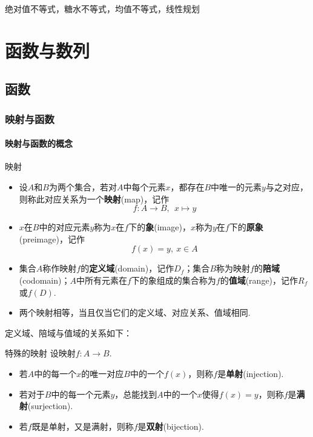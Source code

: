 \documentclass[lang=cn, zihao=4.5]{elegantbook}
\begin{document}
绝对值不等式，糖水不等式，均值不等式，线性规划

\part{函数与数列}

\chapter{函数}

\section{映射与函数}

\subsection{映射与函数的概念}

\begin{definition}{映射}
	\begin{itemize}
		\item 设$A$和$B$为两个集合，若对$A$中每个元素$x$，都存在$B$中唯一的元素$y$与之对应，则称此对应关系为一个\textbf{映射}(map)，记作$$f:A \to B,~~x \mapsto y$$
		\item $x$在$B$中的对应元素$y$称为$x$在$f$下的\textbf{象}(image)，$x$称为$y$在$f$下的\textbf{原象}(preimage)，记作$$f(x) = y,~ x \in A$$
		\item 集合$A$称作映射$f$的\textbf{定义域}(domain)，记作$D_f$；集合$B$称为映射$f$的\textbf{陪域}(codomain)；$A$中所有元素在$f$下的象组成的集合称为$f$的\textbf{值域}(range)，记作$R_f$或$f(D)$.
		\item 两个映射相等，当且仅当它们的定义域、对应关系、值域相同.
	\end{itemize}
\end{definition}

定义域、陪域与值域的关系如下：


\begin{definition}{特殊的映射}
	设映射$f:A \to B$.
	\begin{itemize}
		\item 若$A$中的每一个$x$的唯一对应$B$中的一个$f(x)$，则称$f$是\textbf{单射}(injection).
		\item 若对于$B$中的每一个元素$y$，总能找到$A$中的一个$x$使得$f(x)=y$，则称$f$是\textbf{满射}(surjection).
		\item 若$f$既是单射，又是满射，则称$f$是\textbf{双射}(bijection).
	\end{itemize}
\end{definition}
\end{document}
